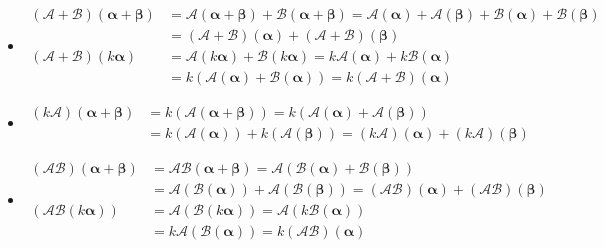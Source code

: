 \documentclass{article}
\begin{document}
				\begin{itemize}
					\item$$
					\begin{aligned}
						(\mathscr{A}+\mathscr{B})(\boldsymbol{\alpha}+\boldsymbol{\beta}) 	&=\mathscr{A}(\boldsymbol{\alpha}+\boldsymbol{\beta})+\mathscr{B}(\boldsymbol{\alpha}+\boldsymbol{\beta})=\mathscr{A}(\boldsymbol{\alpha})+\mathscr{A}(\boldsymbol{\beta})+\mathscr{B}(\boldsymbol{\alpha})+\mathscr{B}(\boldsymbol{\beta}) \\
						&=(\mathscr{A}+\mathscr{B})(\boldsymbol{\alpha})+(\mathscr{A}+\mathscr{B})(\boldsymbol{\beta}) \\
						(\mathscr{A}+\mathscr{B})(k \boldsymbol{\alpha}) &=\mathscr{A}(k \boldsymbol{\alpha})+\mathscr{B}(k 	\boldsymbol{\alpha})=k \mathscr{A}(\boldsymbol{\alpha})+k \mathscr{B}(\boldsymbol{\alpha}) \\
							&=k(\mathscr{A}(\boldsymbol{\alpha})+\mathscr{B}(\boldsymbol{\alpha}))=k(\mathscr{A}+\mathscr{B})(\boldsymbol{\alpha})
					\end{aligned}
					$$
					\item$$
					\begin{aligned}
						(k \mathscr{A})(\boldsymbol{\alpha}+\boldsymbol{\beta}) 	&=k(\mathscr{A}(\boldsymbol{\alpha}+\boldsymbol{\beta}))=k(\mathscr{A}(\boldsymbol{\alpha})+\mathscr{A}(\boldsymbol{\beta})) \\
						&=k(\mathscr{A}(\boldsymbol{\alpha}))+k(\mathscr{A}(\boldsymbol{\beta}))=(k 	\mathscr{A})(\boldsymbol{\alpha})+(k \mathscr{A})(\boldsymbol{\beta})
					\end{aligned}
					$$
					\item$$
					\begin{aligned}
						(\mathscr{A} \mathscr{B})(\boldsymbol{\alpha}+\boldsymbol{\beta}) &=\mathscr{A} 	\mathscr{B}(\boldsymbol{\alpha}+\boldsymbol{\beta})=\mathscr{A}(\mathscr{B}(\boldsymbol{\alpha})+\mathscr{B}(\boldsymbol{\beta})) \\
							&=\mathscr{A}(\mathscr{B}(\boldsymbol{\alpha}))+\mathscr{A}(\mathscr{B}(\boldsymbol{\beta}))=(\mathscr{A} \mathscr{B})(\boldsymbol{\alpha})+(\mathscr{A} \mathscr{B})(\boldsymbol{\beta}) \\
						(\mathscr{A} \mathscr{B}(k \boldsymbol{\alpha})) &=\mathscr{A}(\mathscr{B}(k 	\boldsymbol{\alpha}))=\mathscr{A}(k \mathscr{B}(\boldsymbol{\alpha})) \\
						&=k \mathscr{A}(\mathscr{B}(\boldsymbol{\alpha}))=k(\mathscr{A} \mathscr{B})(\boldsymbol{\alpha})
					\end{aligned}
					$$
				\end{itemize}
\end{document}
